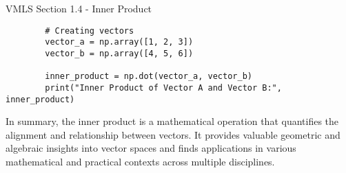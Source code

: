 \begin{notes}{VMLS Section 1.4 - Inner Product}
\begin{Highlight}
\begin{verbatim}
        # Creating vectors
        vector_a = np.array([1, 2, 3])
        vector_b = np.array([4, 5, 6])
        
        inner_product = np.dot(vector_a, vector_b)
        print("Inner Product of Vector A and Vector B:", inner_product)            
        \end{verbatim}
    \end{Highlight}

    In summary, the inner product is a mathematical operation that quantifies the alignment and relationship between vectors. It provides valuable geometric and algebraic insights into vector spaces and finds applications 
    in various mathematical and practical contexts across multiple disciplines.
\end{notes}